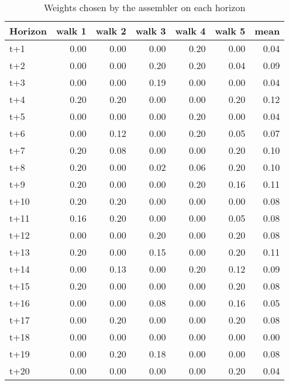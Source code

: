 \begin{table}
\centering
\caption{Weights chosen by the assembler on each horizon}
\label{tab:weights_assembler}
\begin{tabular}{lrrrrrr}
\toprule
Horizon &  walk 1 &  walk 2 &  walk 3 &  walk 4 &  walk 5 &  mean \\
\midrule
t+1  &    0.00 &    0.00 &    0.00 &    0.20 &    0.00 &  0.04 \\
t+2  &    0.00 &    0.00 &    0.20 &    0.20 &    0.04 &  0.09 \\
t+3  &    0.00 &    0.00 &    0.19 &    0.00 &    0.00 &  0.04 \\
t+4  &    0.20 &    0.20 &    0.00 &    0.00 &    0.20 &  0.12 \\
t+5  &    0.00 &    0.00 &    0.00 &    0.20 &    0.00 &  0.04 \\
t+6  &    0.00 &    0.12 &    0.00 &    0.20 &    0.05 &  0.07 \\
t+7  &    0.20 &    0.08 &    0.00 &    0.00 &    0.20 &  0.10 \\
t+8  &    0.20 &    0.00 &    0.02 &    0.06 &    0.20 &  0.10 \\
t+9  &    0.20 &    0.00 &    0.00 &    0.20 &    0.16 &  0.11 \\
t+10 &    0.20 &    0.20 &    0.00 &    0.00 &    0.00 &  0.08 \\
t+11 &    0.16 &    0.20 &    0.00 &    0.00 &    0.05 &  0.08 \\
t+12 &    0.00 &    0.00 &    0.20 &    0.00 &    0.20 &  0.08 \\
t+13 &    0.20 &    0.00 &    0.15 &    0.00 &    0.20 &  0.11 \\
t+14 &    0.00 &    0.13 &    0.00 &    0.20 &    0.12 &  0.09 \\
t+15 &    0.20 &    0.00 &    0.00 &    0.00 &    0.20 &  0.08 \\
t+16 &    0.00 &    0.00 &    0.08 &    0.00 &    0.16 &  0.05 \\
t+17 &    0.00 &    0.20 &    0.00 &    0.00 &    0.20 &  0.08 \\
t+18 &    0.00 &    0.00 &    0.00 &    0.00 &    0.00 &  0.00 \\
t+19 &    0.00 &    0.20 &    0.18 &    0.00 &    0.00 &  0.08 \\
t+20 &    0.00 &    0.00 &    0.00 &    0.00 &    0.20 &  0.04 \\
\bottomrule
\end{tabular}
\end{table}
